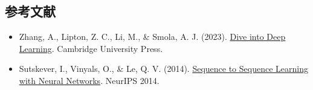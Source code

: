 \FloatBarrier
{}
\hypertarget{ux53c2ux8003ux6587ux732e-24}{%
\subsection{参考文献}\label{ux53c2ux8003ux6587ux732e-24}}

\vspace{0.25em}
\begin{itemize}
\tightlist
\item
  Zhang, A., Lipton, Z. C., Li, M., \& Smola, A. J. (2023). \href{https://D2L.ai}{Dive into Deep Learning}. Cambridge University Press.
\item
  Sutskever, I., Vinyals, O., \& Le, Q. V. (2014). \href{https://proceedings.neurips.cc/paper_files/paper/2014/hash/5a18e133cbf9f257297f410bb7eca942-Abstract.html}{Sequence to Sequence Learning with Neural Networks}. NeurIPS 2014.
\end{itemize}

\clearpage
